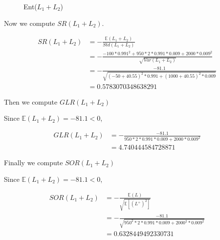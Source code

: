 \documentclass[letterpaper,11pt]{article}
\begin{document}
\begin{spacing}{1.2}
\begin{figure}[htbp]        
 \caption{\label{2} Ent($L_1+L_2$)}      
 \end{figure}


Now we compute $SR(L_1+L_2)$.

\begin{equation}
\begin{aligned}
SR(L_1+L_2) &= -\frac{\mathbb{E}(L_1+L_2)}{Std(L_1+L_2)} \\
&= -\frac{-100*0.991^2+950*2*0.991*0.009+2000*0.009^2}{\sqrt{Var(L_1+L_2)}} \\
&= -\frac{-81.1}{\sqrt{(-50+40.55)^2 * 0.991 + (1000+40.55)^2 * 0.009}} \\
&= 0.5783070348638291
\end{aligned}
\end{equation}

Then we compute $GLR(L_1+L_2)$

Since $\mathbb{E}(L_1+L_2) = -81.1 < 0$,

\begin{equation}
\begin{aligned}
GLR(L_1+L_2) &= -\frac{-81.1}{950*2*0.991*0.009+2000*0.009^2} \\
&= 4.740444584728871
\end{aligned}
\end{equation}

Finally we compute $SOR(L_1+L_2)$

Since $\mathbb{E}(L_1+L_2) = -81.1 < 0$,

\begin{equation}
\begin{aligned}
SOR(L_1+L_2) &= -\frac{\mathbb{E}(L)}{\sqrt{\mathbb{E}[(L^+)^2]}} \\
&= -\frac{-81.1}{\sqrt{950^2*2*0.991*0.009+2000^2*0.009^2}} \\
&= 0.6328449492330731
\end{aligned}
\end{equation}


\end{spacing}
\end{document}

